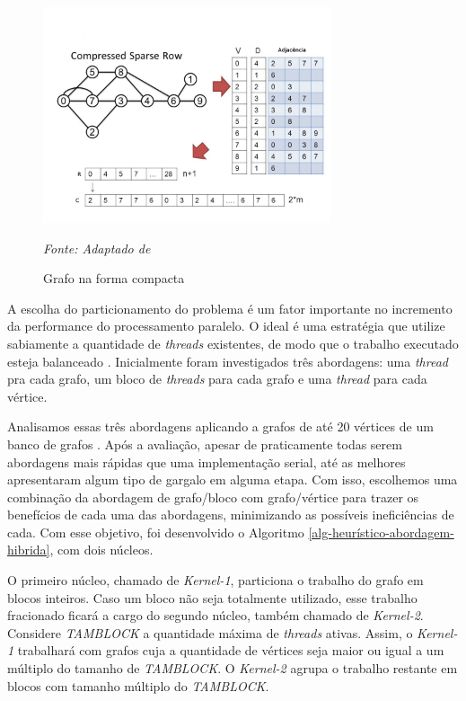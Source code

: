 \begin{figure}[h]
\centering
\includegraphics[width=20pc]{./imagens/csr-exemplo.png}
\caption{Grafo na forma compacta}
\label{fig_csr}
\textit{Fonte: Adaptado de \cite{kamesh2011}}     
\end{figure}


A escolha do particionamento do problema é um fator importante no incremento da performance do processamento paralelo. O ideal é uma estratégia que utilize sabiamente a quantidade de \textit{threads} existentes, de modo que o trabalho executado esteja balanceado \cite{Hong2011b,Hong2011a}. Inicialmente foram investigados três abordagens: uma \textit{thread} pra cada grafo, um bloco de \textit{threads} para cada grafo e uma \textit{thread} para cada vértice.

Analisamos essas três abordagens aplicando a grafos de até 20 vértices de um banco de grafos \cite{hog2013}. 
Após a avaliação, apesar de praticamente todas serem abordagens mais rápidas que uma implementação serial, 
até as melhores apresentaram algum tipo de gargalo em alguma etapa. Com isso, escolhemos uma combinação da abordagem de grafo/bloco com grafo/vértice  para trazer os benefícios de cada uma das abordagens, 
minimizando as possíveis ineficiências de cada. Com esse objetivo,
foi desenvolvido o Algoritmo \ref{alg-heurístico-abordagem-hibrida}, com dois núcleos. 

O primeiro núcleo, chamado de \textit{Kernel-1}, particiona o trabalho do grafo em blocos inteiros. Caso um bloco não seja totalmente utilizado, esse trabalho fracionado ficará a cargo do segundo núcleo, também chamado de \textit{Kernel-2}. Considere \textit{TAMBLOCK} a quantidade máxima de \textit{threads} ativas. Assim, o \textit{Kernel-1} trabalhará com grafos cuja a quantidade de vértices seja maior ou igual a um múltiplo do tamanho de \textit{TAMBLOCK}. O \textit{Kernel-2} agrupa o trabalho restante em blocos com tamanho múltiplo do \textit{TAMBLOCK}. 

